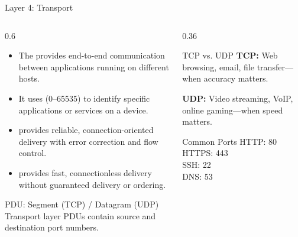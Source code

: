 \documentclass[aspectratio=169]{beamer}  %
\begin{document}
\begin{frame}{Layer 4: Transport}
    \begin{columns}[T]
        \begin{column}{0.6\textwidth}
            \begin{itemize}
                \item The  provides end-to-end communication between applications running on different hosts.
                \item It uses  (0--65535) to identify specific applications or services on a device.
                \item {} provides reliable, connection-oriented delivery with error correction and flow control.
                \item {} provides fast, connectionless delivery without guaranteed delivery or ordering.
            \end{itemize}
            
            \vspace{0.3em}
            \begin{alertblock}{PDU: Segment (TCP) / Datagram (UDP)}
                \scriptsize
                Transport layer PDUs contain source and destination port numbers.
            \end{alertblock}
        \end{column}
        \begin{column}{0.36\textwidth}
            \begin{block}{TCP vs. UDP}
                \small
                \textbf{TCP:} Web browsing, email, file transfer---when accuracy matters.
                
                \vspace{0.3em}
                \textbf{UDP:} Video streaming, VoIP, online gaming---when speed matters.
            \end{block}
            
            \vspace{0.3em}
            \begin{exampleblock}{Common Ports}
                \small
                HTTP: 80 \\
                HTTPS: 443 \\
                SSH: 22 \\
                DNS: 53
            \end{exampleblock}
        \end{column}
    \end{columns}
\end{frame}
\end{document}
